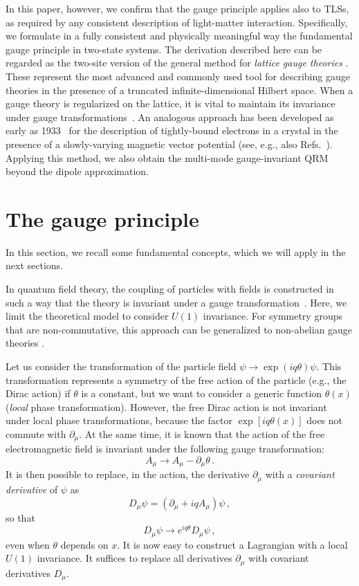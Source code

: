 \documentclass[aps,pra,reprint, superscriptaddress,amsmath,showpacs,longbibliography]{revtex4-2}
\newcommand{\be}{\begin{equation}}
\newcommand{\ee}{\end{equation}}
\begin{document}
In this paper, however, we confirm that the gauge principle applies also to TLSs, as required by any consistent description of light-matter interaction.
Specifically, we formulate in a fully consistent and physically meaningful way the fundamental gauge principle in two-state systems.
The derivation described here  can be regarded as the two-site version of the general method for {\em lattice gauge theories} \cite{Wiese2013}. These represent the most advanced and {commonly} used tool for describing gauge theories in the presence of {a truncated infinite-dimensional Hilbert space}. When a gauge theory is regularized on the lattice, it is vital to maintain its invariance
under gauge transformations~\cite{Wiese2013}. An analogous approach has been developed as early as 1933~\cite{Peirls1933} for the description of  tightly-bound electrons in a crystal in the presence of a slowly-varying magnetic vector potential (see, e.g., also {Refs.}~\cite{Luttinger1951, Hofstadter1976, Graf1995}).
Applying this method, we also obtain the multi-mode gauge-invariant {QRM} beyond the dipole approximation.

\section{The gauge principle}

In this section, we recall some fundamental concepts, which we will apply in the next sections.

In quantum field theory, the coupling of particles with fields is constructed in such a way
that the theory is invariant under a gauge transformation{~\cite{Maggiore2005}}. Here, we limit the {theoretical} model to consider  $U(1)$ invariance.
For symmetry groups that are non-commutative,
this approach can be generalized to 
non-abelian gauge theories \cite{Maggiore2005, Wiese2013}.

Let us consider the transformation of the particle field $\psi \to \exp(i q \theta) \psi$.
This transformation represents a symmetry of the free action of the particle (e.g., the Dirac action) if $\theta$ is a constant, but we want to consider a generic function $\theta(x)$
({\it local} phase transformation).
However, the free Dirac action is not invariant under local phase transformations, because the factor  $\exp[i q \theta(x)]$ does not commute with $\partial_\mu$.
At the same time, it is known that the action of the free electromagnetic field is invariant
under the 
following gauge transformation:
\be\label{gaugeA}
A_\mu \to A_\mu - \partial_\mu {\theta} \, .
\ee
It is then possible to replace, in the action, the derivative $\partial_\mu$ with a {\em covariant derivative} of $\psi$ as
\be 
D_\mu \psi = \left( \partial_\mu + i q A_\mu \right) \psi\, ,
\ee
so that
\be
D_\mu \psi \to e^{i q \theta} D_\mu \psi\, ,
\ee
even when $\theta$ depends on $x$. 
It is now easy to construct a Lagrangian with a local $U(1)$ invariance.
It suffices to replace all derivatives $\partial_\mu$ with covariant derivatives $D_\mu$.
\end{document}
